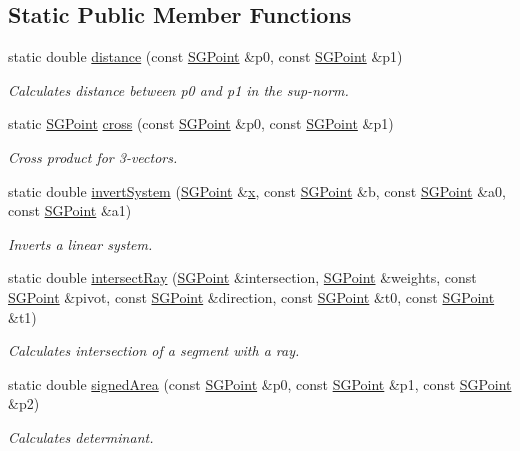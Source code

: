 \subsection*{Static Public Member Functions}
\begin{DoxyCompactItemize}
\item 
\mbox{\label{classSGPoint_a48385eb046cb530f7a7af6a147b6218c}} 
static double \hyperlink{classSGPoint_a48385eb046cb530f7a7af6a147b6218c}{distance} (const \hyperlink{classSGPoint}{S\+G\+Point} \&p0, const \hyperlink{classSGPoint}{S\+G\+Point} \&p1)
\begin{DoxyCompactList}\small\item\em Calculates distance between p0 and p1 in the sup-\/norm. \end{DoxyCompactList}\item 
\mbox{\label{classSGPoint_a7eb01ee0d0f8ea92e05c8b2daf233a3a}} 
static \hyperlink{classSGPoint}{S\+G\+Point} \hyperlink{classSGPoint_a7eb01ee0d0f8ea92e05c8b2daf233a3a}{cross} (const \hyperlink{classSGPoint}{S\+G\+Point} \&p0, const \hyperlink{classSGPoint}{S\+G\+Point} \&p1)
\begin{DoxyCompactList}\small\item\em Cross product for 3-\/vectors. \end{DoxyCompactList}\item 
static double \hyperlink{classSGPoint_a0a613c9498f11a7d2d50c4f7f371dab9}{invert\+System} (\hyperlink{classSGPoint}{S\+G\+Point} \&\hyperlink{classSGPoint_ae4b95f14f367daa07dc982c5bed53a7a}{x}, const \hyperlink{classSGPoint}{S\+G\+Point} \&b, const \hyperlink{classSGPoint}{S\+G\+Point} \&a0, const \hyperlink{classSGPoint}{S\+G\+Point} \&a1)
\begin{DoxyCompactList}\small\item\em Inverts a linear system. \end{DoxyCompactList}\item 
static double \hyperlink{classSGPoint_a81992734a4de046226d60b3df576bbb6}{intersect\+Ray} (\hyperlink{classSGPoint}{S\+G\+Point} \&intersection, \hyperlink{classSGPoint}{S\+G\+Point} \&weights, const \hyperlink{classSGPoint}{S\+G\+Point} \&pivot, const \hyperlink{classSGPoint}{S\+G\+Point} \&direction, const \hyperlink{classSGPoint}{S\+G\+Point} \&t0, const \hyperlink{classSGPoint}{S\+G\+Point} \&t1)
\begin{DoxyCompactList}\small\item\em Calculates intersection of a segment with a ray. \end{DoxyCompactList}\item 
static double \hyperlink{classSGPoint_a24a3cc80a532ee6b5c85713b69153311}{signed\+Area} (const \hyperlink{classSGPoint}{S\+G\+Point} \&p0, const \hyperlink{classSGPoint}{S\+G\+Point} \&p1, const \hyperlink{classSGPoint}{S\+G\+Point} \&p2)
\begin{DoxyCompactList}\small\item\em Calculates determinant. \end{DoxyCompactList}\end{DoxyCompactItemize}
